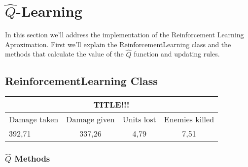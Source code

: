 \section{$ \hat{Q}$-Learning}

In this section we'll address the implementation of the Reinforcement Learning Aproximation. First we'll explain the ReinforcementLearning class and the methods that calculate the value of the $\hat{Q}$ function and updating rules. 

\subsection{ReinforcementLearning Class}



\begin{centering}
 \begin{tabular}{|l||c|c|c|}
	\multicolumn{4}{c}{TITLE!!!} \\
	\hline
		Damage taken & Damage given & Units lost & Enemies killed\\
	\hline
		392,71 & 337,26 & 4,79 & 7,51 \\
	\hline
\end{tabular}
\end{centering}





\subsubsection{$ \hat{Q}$ Methods}